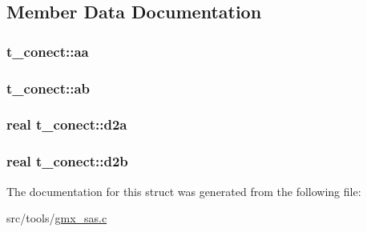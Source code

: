 \subsection{\-Member \-Data \-Documentation}
\hypertarget{structt__conect_a6ce67a9eb8e7f83591567e50b88dda78}{
\subsubsection[{aa}]{ {\bf t\-\_\-conect\-::aa}}}\label{structt__conect_a6ce67a9eb8e7f83591567e50b88dda78}
\hypertarget{structt__conect_a728ff78f30167e6337fc20d7dd6e38f6}{
\subsubsection[{ab}]{ {\bf t\-\_\-conect\-::ab}}}\label{structt__conect_a728ff78f30167e6337fc20d7dd6e38f6}
\hypertarget{structt__conect_a224664af54a72818245521bdaf3a7058}{
\subsubsection[{d2a}]{\setlength{\rightskip}{0pt plus 5cm}real {\bf t\-\_\-conect\-::d2a}}}\label{structt__conect_a224664af54a72818245521bdaf3a7058}
\hypertarget{structt__conect_a4b8bc074b63f65b1272c0a0e3e0befd8}{
\subsubsection[{d2b}]{\setlength{\rightskip}{0pt plus 5cm}real {\bf t\-\_\-conect\-::d2b}}}\label{structt__conect_a4b8bc074b63f65b1272c0a0e3e0befd8}


\-The documentation for this struct was generated from the following file\-:\begin{DoxyCompactItemize}
\item 
src/tools/\hyperlink{gmx__sas_8c}{gmx\-\_\-sas.\-c}\end{DoxyCompactItemize}
